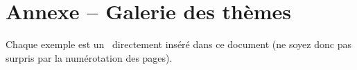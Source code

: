 \documentclass[theme = color]{../main/main}
\begin{document}
\bgroup
    \section*{Annexe -- Galerie des thèmes}%
    \label{tutodoc-theme-gallery}
\egroup

\bigskip\bigskip

\begin{tdocnote}
    Chaque exemple est un \pdf\ directement inséré dans ce document (ne soyez donc pas surpris par la numérotation des pages).
\end{tdocnote}
\end{document}
